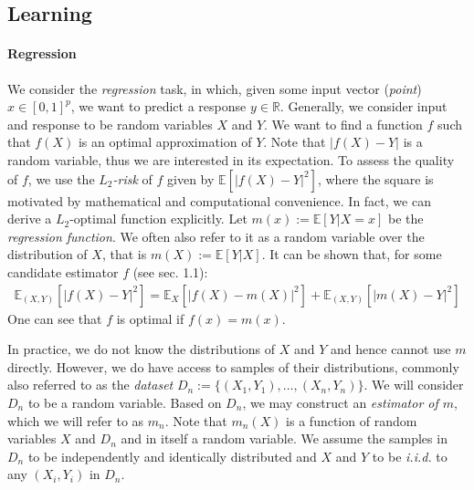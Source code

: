 \documentclass[10pt]{article}
\theoremstyle{definition}
\begin{document}
\subsection{Learning}



\paragraph{Regression} We consider the \emph{regression} task, in which, given some
input vector (\textit{point}) \(x \in [0,1]^p\), we want to predict a response
\(y \in \mathbb{R}\).
%
Generally, we consider input and response to be random variables
\(X\) and \(Y\).
%
We want to find a function 
\(f\) such that \(f(X)\) is an optimal approximation of \(Y\). Note that
\(|f(X)-Y|\) is a random variable, thus we are interested in its
expectation. To assess the quality of \(f\), we use the
\emph{\(L_{2}\)-risk} of \(f\) given by
\(\mathbb{E}\left[|f(X)-Y|^2\right]\), where the square is motivated by
mathematical and computational convenience.
%
In fact, we can derive a
\(L_{2}\)-optimal function explicitly.
%
Let $m(x) := \mathbb{E}\left[ Y | X = x \right]$ be the \emph{regression
  function}. We often also refer to it as a random variable over the
distribution of $X$, that is $m(X) := \mathbb{E}\left[ Y | X \right]$.
%
It can be shown
that, for some candidate estimator $f$ (see \cite{gyorfi_DistributionFreeTheoryNonparametric_2002} sec. 1.1):
\begin{align}
  \mathbb{E}_{(X,Y)}\left[|f(X)-Y|^2\right]
  = \mathbb{E}_X\left[|f(X)-m(X)|^2\right]
  + \mathbb{E}_{(X,Y)}\left[|m(X) - Y|^2\right]
  \label{eq:basic-error-decomp}
\end{align}
%
One can see that \(f\) is optimal if \(f(x)=m(x)\).

In practice, we do not know the distributions of \(X\) and \(Y\) and hence
cannot use $m$ directly. However, we do have access to samples of their
distributions, commonly also referred to as the \textit{dataset} \(D_{n} := \{
(X_{1}, Y_{1}), \dots, (X_{n}, Y_{n}) \}\). We will consider $D_n$ to be a
random variable.
%
Based on \(D_{n}\), we
may construct an \emph{estimator of $m$}, which we will refer to as
$m_n$. Note that $m_n(X)$ is a function of random variables $X$ and $D_n$ and in
itself a random variable. We assume the samples in $D_n$ to be independently and
identically distributed and $X$ and $Y$ to be \textit{i.i.d.} to any $(X_i,
Y_i)$ in $D_n$.
\end{document}
